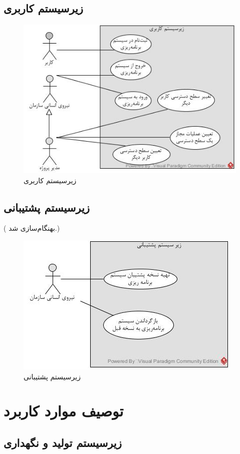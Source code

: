 \subsection{زیرسیستم کاربری}
\begin{figure}[H]
	\centering
	\includegraphics[scale=0.9]{img/usecase/user}
	\caption{زیرسیستم کاربری}
\end{figure}

\subsection{زیرسیستم پشتیبانی}
({\color{red} بهنگام‌سازی شد.})
\begin{figure}[H]
	\centering
	\includegraphics[scale=1]{img/usecase/support}
	\caption{زیرسیستم پشتیبانی}
\end{figure}

\newpage
\section{توصیف موارد کاربرد}
\subsection{زیرسیستم تولید و نگهداری}



